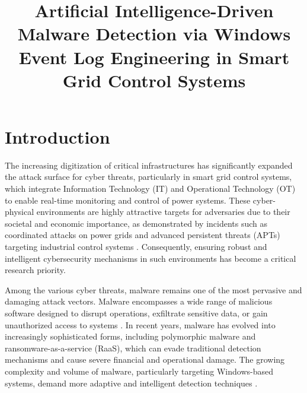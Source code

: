 \documentclass[conference]{IEEEtran}
\begin{document}
\title{Artificial Intelligence-Driven Malware Detection via Windows Event Log Engineering in Smart Grid Control Systems}

\author{
\and
{}
\and
{}
}

\maketitle


\section{Introduction}

The increasing digitization of critical infrastructures has significantly expanded the attack surface for cyber threats, particularly in smart grid control systems, which integrate Information Technology (IT) and Operational Technology (OT) to enable real-time monitoring and control of power systems. These cyber-physical environments are highly attractive targets for adversaries due to their societal and economic importance, as demonstrated by incidents such as coordinated attacks on power grids and advanced persistent threats (APTs) targeting industrial control systems \cite{nafees2023}. Consequently, ensuring robust and intelligent cybersecurity mechanisms in such environments has become a critical research priority.

Among the various cyber threats, malware remains one of the most pervasive and damaging attack vectors. Malware encompasses a wide range of malicious software designed to disrupt operations, exfiltrate sensitive data, or gain unauthorized access to systems \cite{maniriho2024}. In recent years, malware has evolved into increasingly sophisticated forms, including polymorphic malware and ransomware-as-a-service (RaaS), which can evade traditional detection mechanisms and cause severe financial and operational damage. The growing complexity and volume of malware, particularly targeting Windows-based systems, demand more adaptive and intelligent detection techniques \cite{achmad2025}.
\end{document}
